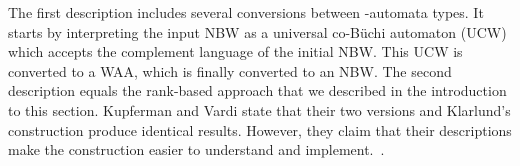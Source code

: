 The first description includes several conversions between \om-automata types. It starts by interpreting the input NBW as a universal co-Büchi automaton (UCW) which accepts the complement language of the initial NBW. This UCW is converted to a WAA, which is finally converted to an NBW. The second description equals the rank-based approach that we described in the introduction to this section. Kupferman and Vardi state that their two versions and Klarlund's construction produce identical results. However, they claim that their descriptions make the construction easier to understand and implement.~\cite{Kupferman:2001}.






